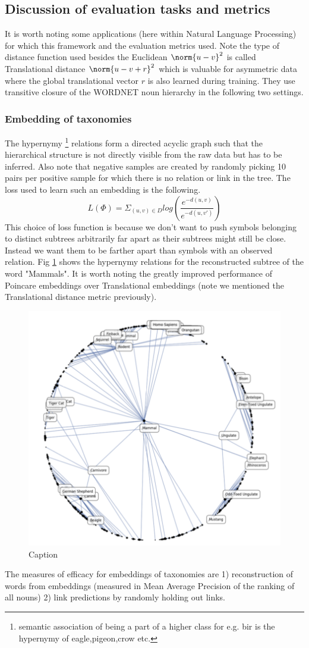 \subsection{Discussion of evaluation tasks and metrics}
It is worth noting some applications (here within Natural Language Processing) for which this framework and the evaluation metrics used. Note the type of distance function used besides the Euclidean $\norm{u -v}^2$ is called Translational distance $\norm{u-v+r}^2$ which is valuable for asymmetric data where the global translational vector $r$ is also learned during training. They use transitive closure of the WORDNET noun hierarchy in the following two settings.
\subsubsection{Embedding of taxonomies}
The hypernymy \footnote{semantic association of being a part of a higher class for e.g. bir is the hypernymy of eagle,pigeon,crow etc.} relations form a directed acyclic graph such that the hierarchical structure is not directly visible from the raw data but has to be inferred. Also note that negative samples are created by randomly picking 10 pairs per positive sample for which there is no relation or link in the tree. The loss used to learn such an embedding is the following.
$$L(\Phi) = \Sigma_{(u,v)\in D} log (\frac{e^{-d(u,v)}}{e^{-d(u,v')}})$$
This choice of loss function is because we don’t want to push symbols belonging to distinct subtrees arbitrarily far apart as their subtrees might still be close. Instead we want them to be farther apart than symbols with an observed relation. Fig \ref{poincare-embedding} shows the hypernymy relations for the reconstructed subtree of the word "Mammals". It is worth noting the greatly improved performance of Poincare embeddings over Translational embeddings (note we mentioned the Translational distance metric previously).
\begin{figure}
    \centering
    \includegraphics[width=.7\textwidth]{chapter_16/files/poincare-embedding.png}
    \caption{Caption}
    \label{poincare-embedding}
\end{figure}
The measures of efficacy for embeddings of taxonomies are 1) reconstruction of words from embeddings (measured in Mean Average Precision of the ranking of all nouns) 2) link predictions by randomly holding out links.
